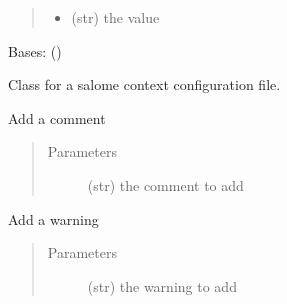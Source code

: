 \documentclass[a4paper,10pt,english]{sphinxmanual}
\begin{document}
\begin{fulllineitems}
\begin{fulllineitems}
\begin{quote}
\begin{description}
\begin{itemize}
\item {} 
 \textendash{} (str) the value

\end{itemize}

\end{description}\end{quote}

\end{fulllineitems}


\end{fulllineitems}


\begin{fulllineitems}
\label{\detokenize{apidoc_src/src:src.fileEnviron.ContextFileEnviron}}
Bases: {\hyperref[\detokenize{apidoc_src/src:src.fileEnviron.FileEnviron}]{}} ()

Class for a salome context configuration file.

\begin{fulllineitems}
\label{\detokenize{apidoc_src/src:src.fileEnviron.ContextFileEnviron.add_echo}}
Add a comment
\begin{quote}\begin{description}
\item[{Parameters}] \leavevmode
{} \textendash{} (str) the comment to add

\end{description}\end{quote}

\end{fulllineitems}


\begin{fulllineitems}
\label{\detokenize{apidoc_src/src:src.fileEnviron.ContextFileEnviron.add_warning}}
Add a warning
\begin{quote}\begin{description}
\item[{Parameters}] \leavevmode
{} \textendash{} (str) the warning to add


\end{description}
\end{quote}
\end{fulllineitems}
\end{fulllineitems}
\end{document}

